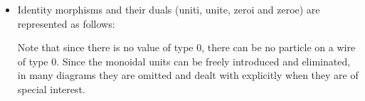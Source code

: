\documentclass[preprint]{sigplanconf}
\begin{document}
{\begin{itemize}
\item Identity morphisms and their duals ({{uniti, unite, zeroi}} and
  {{zeroe}}) are represented as follows:
\begin{multicols}{2}
\begin{center}
\end{center}
\begin{center}
\end{center}  
\end{multicols}
\begin{multicols}{2}
\begin{center}
\end{center}
\columnbreak
\begin{center}
\end{center}
\end{multicols}
Note that since there is no value of type 0, there can be no particle
on a wire of type {{0}}.  Since the monoidal units can be freely
introduced and eliminated, in many diagrams they are omitted and dealt
with explicitly when they are of special interest.


\end{itemize}}
\end{document}
